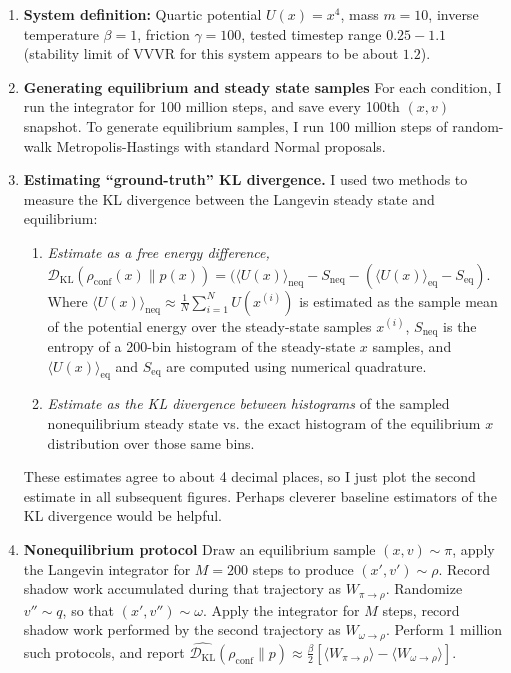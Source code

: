\documentclass[11pt]{article}
\newcommand{\kldiv}{\mathcal{D}_\text{KL}}
\newcommand{\conf}{\rho_\text{conf}}
\begin{document}
\begin{enumerate}
\item \textbf{System definition:} Quartic potential $U(x) = x^4$, mass $m=10$, inverse temperature $\beta = 1$, friction $\gamma = 100$, tested timestep range $0.25-1.1$ (stability limit of VVVR for this system appears to be about $1.2$).
\item \textbf{Generating equilibrium and steady state samples} For each condition, I run the integrator for 100 million steps, and save every 100th $(x,v)$ snapshot. To generate equilibrium samples, I run 100 million steps of random-walk Metropolis-Hastings with standard Normal proposals.
\item \textbf{Estimating ``ground-truth'' KL divergence.} I used two methods to measure the KL divergence between the Langevin steady state and equilibrium:
\begin{enumerate}
\item \textit{Estimate as a free energy difference,} $\kldiv( \conf(x) \| p(x) ) = (\langle U(x) \rangle_\text{neq} - S_\text{neq} -  (\langle U(x) \rangle_\text{eq} - S_\text{eq})$. Where $\langle U(x) \rangle_\text{neq} \approx \frac{1}{N} \sum_{i=1}^N U(x^{(i)})$ is estimated as the sample mean of the potential energy over the steady-state samples $x^{(i)}$, $S_\text{neq}$ is the entropy of a 200-bin histogram of the steady-state $x$ samples, and $\langle U(x) \rangle_\text{eq}$ and $S_\text{eq}$ are computed using numerical quadrature.
\item \textit{Estimate as the KL divergence between histograms} of the sampled nonequilibrium steady state vs. the exact histogram of the equilibrium $x$ distribution over those same bins.
\end{enumerate}
These estimates agree to about 4 decimal places, so I just plot the second estimate in all subsequent figures.
Perhaps cleverer baseline estimators of the KL divergence would be helpful.
\item \textbf{Nonequilibrium protocol} Draw an equilibrium sample $(x,v) \sim \pi$, apply the Langevin integrator for $M=200$ steps to produce $(x', v') \sim \rho$. Record shadow work accumulated during that trajectory as $W_{\pi \to \rho}$. Randomize $v'' \sim q$, so that $(x', v'') \sim \omega$. Apply the integrator for $M$ steps, record shadow work performed by the second trajectory as $W_{\omega \to \rho}$. Perform 1 million such protocols, and report $\hat{\kldiv}(\conf \| p) \approx \frac{\beta}{2} [ \langle W_{\pi \to \rho} \rangle - \langle W_{\omega \to \rho} \rangle ]$.
\end{enumerate}
\end{document}
